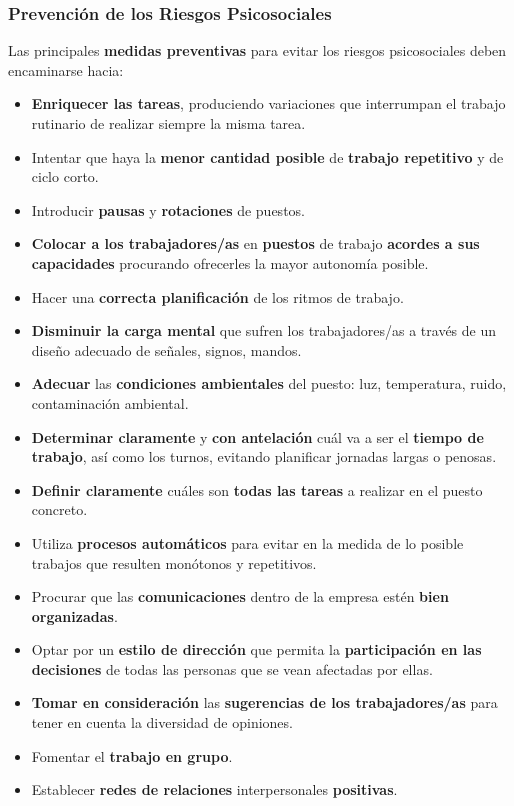 \subsubsection{Prevención de los Riesgos Psicosociales}

Las principales \textbf{medidas preventivas} para evitar los riesgos psicosociales deben encaminarse hacia:

\begin{itemize}
    \item \textbf{Enriquecer las tareas}, produciendo variaciones que interrumpan el trabajo rutinario de realizar siempre la misma tarea.
    \item Intentar que haya la \textbf{menor cantidad posible} de \textbf{trabajo repetitivo} y de ciclo corto.
    \item Introducir \textbf{pausas} y \textbf{rotaciones} de puestos.
    \item \textbf{Colocar a los trabajadores/as} en \textbf{puestos} de trabajo \textbf{acordes a sus capacidades} procurando ofrecerles la mayor autonomía posible.
    \item Hacer una \textbf{correcta planificación} de los ritmos de trabajo.
    \item \textbf{Disminuir la carga mental} que sufren los trabajadores/as a través de un diseño adecuado de señales, signos, mandos.
    \item \textbf{Adecuar} las \textbf{condiciones ambientales} del puesto: luz, temperatura, ruido, contaminación ambiental.
    \item \textbf{Determinar claramente} y \textbf{con antelación} cuál va a ser el \textbf{tiempo de trabajo}, así como los turnos, evitando planificar jornadas largas o penosas.
    \item \textbf{Definir claramente} cuáles son \textbf{todas las tareas} a realizar en el puesto concreto.
    \item Utiliza \textbf{procesos automáticos} para evitar en la medida de lo posible trabajos que resulten monótonos y repetitivos.
    \item Procurar que las \textbf{comunicaciones} dentro de la empresa estén \textbf{bien organizadas}.
    \item Optar por un \textbf{estilo de dirección} que permita la \textbf{participación en las decisiones} de todas las personas que se vean afectadas por ellas.
    \item \textbf{Tomar en consideración} las \textbf{sugerencias de los trabajadores/as} para tener en cuenta la diversidad de opiniones.
    \item Fomentar el \textbf{trabajo en grupo}.
    \item Establecer \textbf{redes de relaciones} interpersonales \textbf{positivas}.
 \end{itemize}

